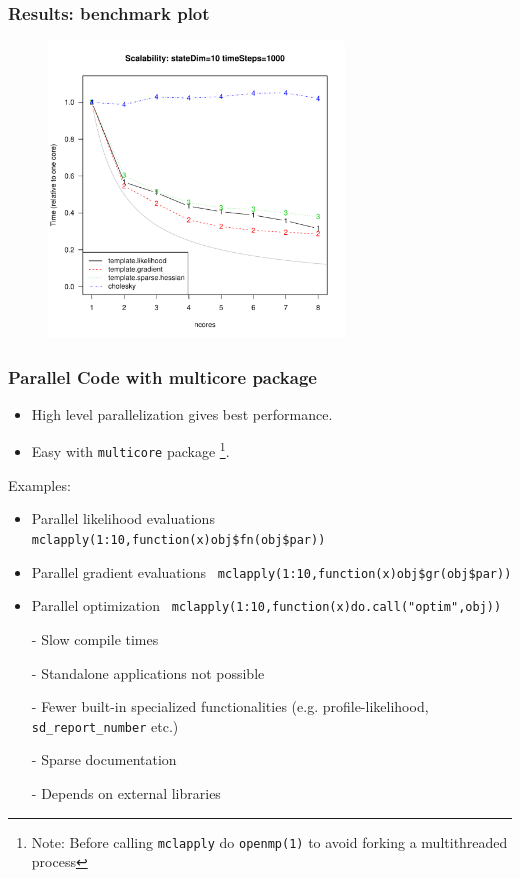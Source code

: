 \documentclass[compress]{beamer}
\begin{document}
\begin{frame}
  \frametitle{Results: benchmark plot}
    \begin{figure}[!htb]
      \centering
      \includegraphics[width=0.7\textwidth]{results/scalability.pdf}
    \end{figure}
\end{frame}


\begin{frame}
  \frametitle{Parallel Code with multicore package}
  \begin{itemize}
  \item High level parallelization gives best performance.
  \item Easy with \texttt{multicore} package \footnote{Note: Before
      calling \texttt{mclapply} do \texttt{openmp(1)} to avoid forking a
      multithreaded process}.
  \end{itemize}
  Examples:
  \begin{itemize}
  \item Parallel likelihood evaluations \texttt{
      mclapply(1:10,function(x)obj\$fn(obj\$par))}
  \item Parallel gradient evaluations \texttt{
      mclapply(1:10,function(x)obj\$gr(obj\$par))}
  \item Parallel optimization \texttt{
      mclapply(1:10,function(x)do.call("optim",obj))}
  \end{itemize}
\end{frame}


\begin{frame}
  \begin{itemize}
    \item[-] Slow compile times
    \item[-] Standalone applications not possible
    \item[-] Fewer built-in specialized functionalities (e.g. profile-likelihood, \texttt{sd\_report\_number} etc.)
    \item[-] Sparse documentation
    \item[-] Depends on external libraries
  \end{itemize}
\end{frame}
\end{document}

